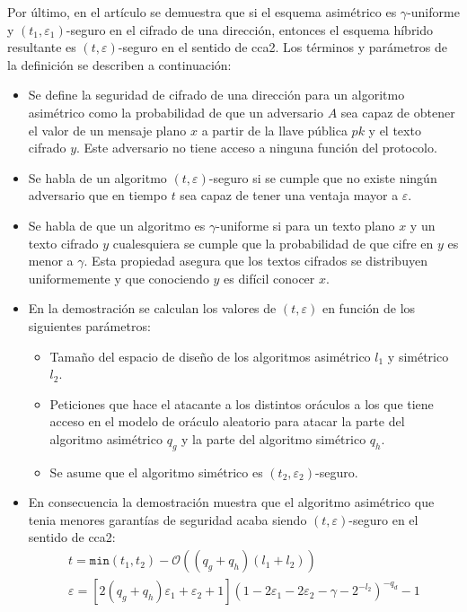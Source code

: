 Por último, en el artículo \cite{Fujisaki1999} se demuestra que si el esquema asimétrico es \(\gamma\)-uniforme y \((t_1,\varepsilon_1)\)-seguro en el cifrado de una dirección, entonces el esquema híbrido resultante es \((t,\varepsilon)\)-seguro en el sentido de \acrshort{cca2}. Los términos y parámetros de la definición se describen a continuación:
\begin{itemize}
	\item  Se define la seguridad de cifrado de una dirección para un algoritmo asimétrico como la probabilidad de que un adversario \(A\) sea capaz de obtener el valor de un mensaje plano \(x\) a partir de la llave pública \(pk\) y el texto cifrado \(y\). Este adversario no tiene acceso a ninguna función del protocolo.
	\item Se habla de un algoritmo \((t,\varepsilon)\)-seguro si se cumple que no existe ningún adversario que en tiempo \(t\) sea capaz de tener una ventaja mayor a \(\varepsilon\).
	\item Se habla de que un algoritmo es \(\gamma\)-uniforme si para un texto plano \(x\) y un texto cifrado \(y\) cualesquiera se cumple que la probabilidad de que cifre en \(y\) es menor a $\gamma$. Esta propiedad asegura que los textos cifrados se distribuyen uniformemente y que conociendo \(y\) es difícil conocer \(x\).
	\item En la demostración se calculan los valores de \((t,\varepsilon)\) en función de los siguientes parámetros:
	\begin{itemize}
		\item Tamaño del espacio de diseño de los algoritmos asimétrico \(l_1\) y simétrico \(l_2\).
		\item Peticiones que hace el atacante a los distintos oráculos a los que tiene acceso en el modelo de oráculo aleatorio para atacar la parte del algoritmo asimétrico \(q_g\) y la parte del algoritmo simétrico \(q_h\).  
		\item Se asume que el algoritmo simétrico es \((t_2,\varepsilon_2)\)-seguro.
	\end{itemize}
	\item En consecuencia la demostración muestra que el algoritmo asimétrico que tenia menores garantías de seguridad acaba siendo \((t,\varepsilon)\)-seguro en el sentido de \acrshort{cca2}:
	\begin{equation}
		\begin{array}{l}
			t=\texttt{min}(t_1,t_2)-\mathcal{O}((q_g+q_h)(l_1+l_2))\\
			\varepsilon=\left[2(q_g+q_h)\varepsilon_1+\varepsilon_2+1\right]\left(1-2\varepsilon_1-2\varepsilon_2-\gamma-2^{-l_2}\right)^{-q_d}-1
		\end{array}
	\end{equation}
\end{itemize}
